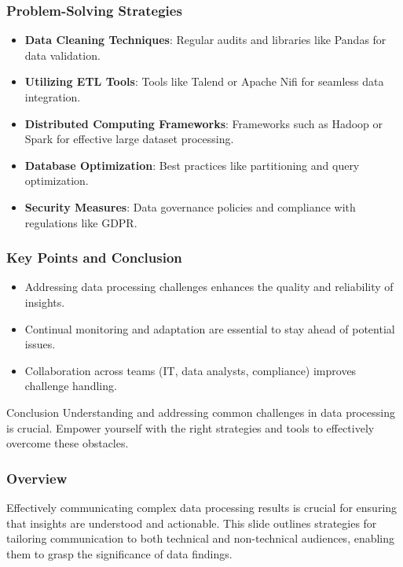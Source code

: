 \documentclass[aspectratio=169]{beamer}
\begin{document}
\begin{frame}[fragile]
    \frametitle{Problem-Solving Strategies}
    \begin{itemize}
        \item \textbf{Data Cleaning Techniques}: Regular audits and libraries like Pandas for data validation.
        \item \textbf{Utilizing ETL Tools}: Tools like Talend or Apache Nifi for seamless data integration.
        \item \textbf{Distributed Computing Frameworks}: Frameworks such as Hadoop or Spark for effective large dataset processing.
        \item \textbf{Database Optimization}: Best practices like partitioning and query optimization.
        \item \textbf{Security Measures}: Data governance policies and compliance with regulations like GDPR.
    \end{itemize}
\end{frame}

\begin{frame}[fragile]
    \frametitle{Key Points and Conclusion}
    \begin{itemize}
        \item Addressing data processing challenges enhances the quality and reliability of insights.
        \item Continual monitoring and adaptation are essential to stay ahead of potential issues.
        \item Collaboration across teams (IT, data analysts, compliance) improves challenge handling.
    \end{itemize}
    \begin{block}{Conclusion}
        Understanding and addressing common challenges in data processing is crucial. 
        Empower yourself with the right strategies and tools to effectively overcome these obstacles.
    \end{block}
\end{frame}

\begin{frame}
    \titlepage
\end{frame}

\begin{frame}[fragile]
    \frametitle{Overview}
    Effectively communicating complex data processing results is crucial for ensuring that insights are understood and actionable. This slide outlines strategies for tailoring communication to both technical and non-technical audiences, enabling them to grasp the significance of data findings.
\end{frame}
\end{document}
